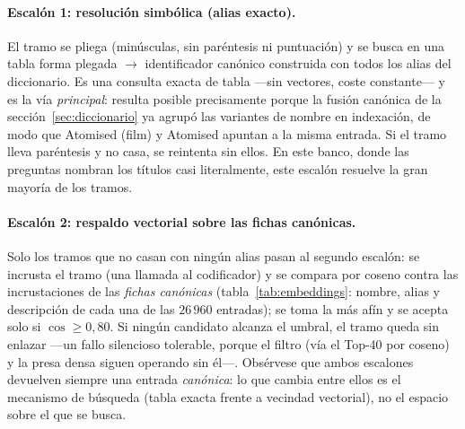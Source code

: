 \documentclass[11pt,a4paper]{article}
\begin{document}
\paragraph{Escalón 1: resolución simbólica (alias exacto).}
El tramo se pliega (minúsculas, sin paréntesis ni puntuación) y se busca en
una tabla forma plegada $\to$ identificador canónico construida con todos
los alias del diccionario. Es una consulta exacta de tabla ---sin vectores,
coste constante--- y es la vía \emph{principal}: resulta posible
precisamente porque la fusión canónica de la
sección~\ref{sec:diccionario} ya agrupó las variantes de nombre en
indexación, de modo que \guillemotleft{}Atomised (film)\guillemotright{} y \guillemotleft{}Atomised\guillemotright{} apuntan a la
misma entrada. Si el tramo lleva paréntesis y no casa, se reintenta sin
ellos. En este banco, donde las preguntas nombran los títulos casi
literalmente, este escalón resuelve la gran mayoría de los tramos.

\paragraph{Escalón 2: respaldo vectorial sobre las fichas canónicas.}
Solo los tramos que no casan con ningún alias pasan al segundo escalón: se
incrusta el tramo (una llamada al codificador) y se compara por coseno
contra las incrustaciones de las \emph{fichas canónicas}
(tabla~\ref{tab:embeddings}: nombre, alias y descripción de cada una de
las $26\,960$ entradas); se toma la más afín y se acepta solo si
$\cos \geq 0{,}80$. Si ningún candidato alcanza el umbral, el tramo queda
sin enlazar ---un fallo silencioso tolerable, porque el filtro (vía el
Top-40 por coseno) y la presa densa siguen operando sin él---. Obsérvese
que ambos escalones devuelven siempre una entrada \emph{canónica}: lo que
cambia entre ellos es el mecanismo de búsqueda (tabla exacta frente a
vecindad vectorial), no el espacio sobre el que se busca.
\end{document}
